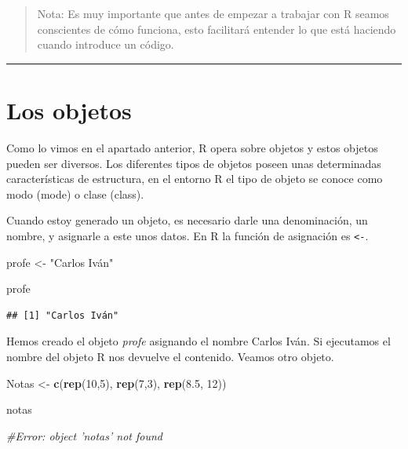 \documentclass[]{article}
\newenvironment{Shaded}{\begin{snugshade}}{\end{snugshade}}
\newcommand{\KeywordTok}[1]{\textcolor[rgb]{0.13,0.29,0.53}{\textbf{{#1}}}}
\newcommand{\DecValTok}[1]{\textcolor[rgb]{0.00,0.00,0.81}{{#1}}}
\newcommand{\FloatTok}[1]{\textcolor[rgb]{0.00,0.00,0.81}{{#1}}}
\newcommand{\StringTok}[1]{\textcolor[rgb]{0.31,0.60,0.02}{{#1}}}
\newcommand{\CommentTok}[1]{\textcolor[rgb]{0.56,0.35,0.01}{\textit{{#1}}}}
\newcommand{\NormalTok}[1]{{#1}}
\begin{document}
\begin{quote}
Nota: Es muy importante que antes de empezar a trabajar con R seamos
conscientes de cómo funciona, esto facilitará entender lo que está
haciendo cuando introduce un código.
\end{quote}

\begin{center}\rule{0.5\linewidth}{\linethickness}\end{center}

\section{Los objetos}\label{los-objetos}

Como lo vimos en el apartado anterior, R opera sobre objetos y estos
objetos pueden ser diversos. Los diferentes tipos de objetos poseen unas
determinadas características de estructura, en el entorno R el tipo de
objeto se conoce como modo (mode) o clase (class).

Cuando estoy generado un objeto, es necesario darle una denominación, un
nombre, y asignarle a este unos datos. En R la función de asignación es
\texttt{\textless{}-}.

\begin{Shaded}
\begin{Highlighting}[]
\NormalTok{profe <-}\StringTok{ "Carlos Iván"}

\NormalTok{profe}
\end{Highlighting}
\end{Shaded}

\begin{verbatim}
## [1] "Carlos Iván"
\end{verbatim}

Hemos creado el objeto \emph{profe} asignando el nombre Carlos Iván. Si
ejecutamos el nombre del objeto R nos devuelve el contenido. Veamos otro
objeto.

\begin{Shaded}
\begin{Highlighting}[]
\NormalTok{Notas <-}\StringTok{ }\KeywordTok{c}\NormalTok{(}\KeywordTok{rep}\NormalTok{(}\DecValTok{10}\NormalTok{,}\DecValTok{5}\NormalTok{), }\KeywordTok{rep}\NormalTok{(}\DecValTok{7}\NormalTok{,}\DecValTok{3}\NormalTok{), }\KeywordTok{rep}\NormalTok{(}\FloatTok{8.5}\NormalTok{, }\DecValTok{12}\NormalTok{))}

\NormalTok{notas}

\CommentTok{#Error: object 'notas' not found}
\end{Highlighting}
\end{Shaded}
\end{document}
